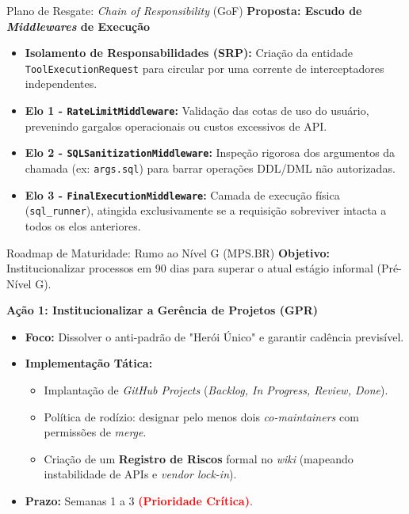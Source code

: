 \documentclass[10pt, aspectratio=169]{beamer}
\begin{document}
\begin{frame}{Plano de Resgate: \textit{Chain of Responsibility} (GoF)}
    \textbf{Proposta: Escudo de \textit{Middlewares} de Execução}
    \vspace{0.3cm}
    \begin{itemize}
        \item \textbf{Isolamento de Responsabilidades (SRP):} Criação da entidade \texttt{ToolExecutionRequest} para circular por uma corrente de interceptadores independentes.
        \item \textbf{Elo 1 - \texttt{RateLimitMiddleware}:} Validação das cotas de uso do usuário, prevenindo gargalos operacionais ou custos excessivos de API.
        \item \textbf{Elo 2 - \texttt{SQLSanitizationMiddleware}:} Inspeção rigorosa dos argumentos da chamada (ex: \texttt{args.sql}) para barrar operações DDL/DML não autorizadas.
        \item \textbf{Elo 3 - \texttt{FinalExecutionMiddleware}:} Camada de execução física (\texttt{sql\_runner}), atingida exclusivamente se a requisição sobreviver intacta a todos os elos anteriores.
    \end{itemize}
\end{frame}

\begin{frame}{Roadmap de Maturidade: Rumo ao Nível G (MPS.BR)}
    \textbf{Objetivo:} Institucionalizar processos em 90 dias para superar o atual estágio informal (Pré-Nível G).
    \vspace{0.3cm}

    \textbf{Ação 1: Institucionalizar a Gerência de Projetos (GPR)}
    \begin{itemize}
        \item \textbf{Foco:} Dissolver o anti-padrão de "Herói Único" e garantir cadência previsível.
        \item \textbf{Implementação Tática:} 
        \begin{itemize}
            \item Implantação de \textit{GitHub Projects} (\textit{Backlog, In Progress, Review, Done}).
            \item Política de rodízio: designar pelo menos dois \textit{co-maintainers} com permissões de \textit{merge}.
            \item Criação de um \textbf{Registro de Riscos} formal no \textit{wiki} (mapeando instabilidade de APIs e \textit{vendor lock-in}).
        \end{itemize}
        \item \textbf{Prazo:} Semanas 1 a 3 \textcolor{red}{\textbf{(Prioridade Crítica)}}.
    \end{itemize}
\end{frame}
\end{document}
